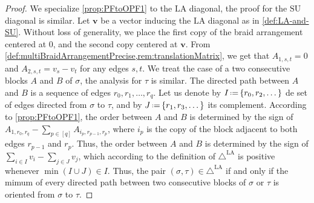 \documentclass{amsart}
\theoremstyle{definition}
\renewcommand{\b}[1]{{\boldsymbol{#1}}} %
\newcommand{\eqdef}{\mbox{\,\raisebox{0.2ex}{\scriptsize\ensuremath{\mathrm:}}\ensuremath{=}\,}} %
\renewcommand{\b}[1]{\boldsymbol{#1}} %
\newcommand{\SU}{\mathrm{SU}}
\newcommand{\LA}{\mathrm{LA}}
\newcommand{\LAD}{\triangle^{\mathrm{LA}}}
\begin{document}
\begin{proof}
We specialize \cref{prop:PFtoOPF1} to the $\LA$ diagonal, the proof for the $\SU$ diagonal is similar. 
Let $\b{v}$ be a vector inducing the $\LA$ diagonal as in \cref{def:LA-and-SU}.
Without loss of generality, we place the first copy of the braid arrangement centered at $0$, and the second copy centered at $\b{v}$.
From \cref{def:multiBraidArrangementPrecise,rem:translationMatrix}, we get that $A_{1,s,t}=0$ and $A_{2,s,t}=v_s-v_t$ for any edges $s,t$.
We treat the case of a two consecutive blocks $A$ and $B$ of $\sigma$, the analysis for $\tau$ is similar. 
The directed path between $A$ and $B$ is a sequence of edges $r_0,r_1,\dots,r_q$.  
Let us denote by $I \eqdef \{r_0,r_2,\dots\}$ de set of edges directed from $\sigma$ to $\tau$, and by $J \eqdef \{r_1,r_3,\dots\}$ its complement. 
According to \cref{prop:PFtoOPF1}, the order between $A$ and $B$ is determined by the sign of $A_{1,r_0,r_q}- \sum_{p \in [q]} A_{i_p,r_{p-1},r_p}$, where $i_p$ is the copy of the block adjacent to both edges $r_{p-1}$ and $r_p$. 
Thus, the order between $A$ and $B$ is determined by the sign of $\sum_{i \in I} v_i - \sum_{j \in J} v_j$, which according to the definition of $\LAD$ is positive whenever $\min(I\cup J) \in I$. 
Thus, the pair $(\sigma,\tau) \in \LAD$ if and only if the mimum of every directed path between two consecutive blocks of $\sigma$ or $\tau$ is oriented from $\sigma$ to $\tau$. 
\end{proof}
\end{document}
